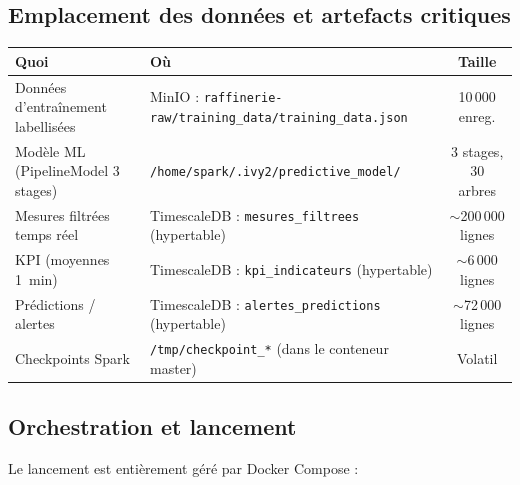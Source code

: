 \documentclass[12pt,a4paper]{article}
\begin{document}
\subsection{Emplacement des données et artefacts critiques}

\begin{center}
\small
\begin{tabularx}{\textwidth}{|l|X|c|}
\hline
\textbf{Quoi} & \textbf{Où} & \textbf{Taille} \\
\hline
Données d'entraînement labellisées & MinIO : \texttt{raffinerie-raw/training\_data/training\_data.json} & 10\,000 enreg. \\
\hline
Modèle ML (PipelineModel 3 stages) & \texttt{/home/spark/.ivy2/predictive\_model/} & 3 stages, 30 arbres \\
\hline
Mesures filtrées temps réel & TimescaleDB : \texttt{mesures\_filtrees} (hypertable) & $\sim$200\,000 lignes \\
\hline
KPI (moyennes 1~min) & TimescaleDB : \texttt{kpi\_indicateurs} (hypertable) & $\sim$6\,000 lignes \\
\hline
Prédictions / alertes & TimescaleDB : \texttt{alertes\_predictions} (hypertable) & $\sim$72\,000 lignes \\
\hline
Checkpoints Spark & \texttt{/tmp/checkpoint\_*} (dans le conteneur master) & Volatil \\
\hline
\end{tabularx}
\end{center}

\subsection{Orchestration et lancement}

Le lancement est entièrement géré par Docker Compose :
\end{document}
